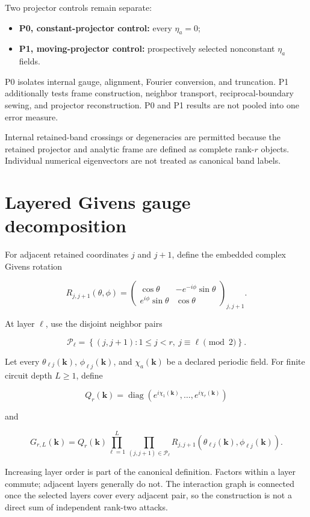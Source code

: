 \documentclass[11pt]{article}
\begin{document}
Two projector controls remain separate:

\begin{itemize}
\item \textbf{P0, constant-projector control:} every $\eta_a=0$;
\item \textbf{P1, moving-projector control:} prospectively selected nonconstant $\eta_a$ fields.
\end{itemize}

P0 isolates internal gauge, alignment, Fourier conversion, and truncation. P1 additionally
tests frame construction, neighbor transport, reciprocal-boundary sewing, and projector
reconstruction. P0 and P1 results are not pooled into one error measure.

Internal retained-band crossings or degeneracies are permitted because the retained
projector and analytic frame are defined as complete rank-$r$ objects. Individual
numerical eigenvectors are not treated as canonical band labels.

\section{Layered Givens gauge decomposition}

For adjacent retained coordinates $j$ and $j+1$, define the embedded complex Givens
rotation

\[
R_{j,j+1}(\theta,\phi)=
\begin{pmatrix}
\cos\theta&-e^{-i\phi}\sin\theta\\
e^{i\phi}\sin\theta&\cos\theta
\end{pmatrix}_{j,j+1}.
\]

At layer $\ell$, use the disjoint neighbor pairs

\[
\mathcal P_\ell=
\left\{(j,j+1):1\leq j<r,\ j\equiv\ell\pmod 2\right\}.
\]

Let every $\theta_{\ell j}(\mathbf k)$, $\phi_{\ell j}(\mathbf k)$, and
$\chi_a(\mathbf k)$ be a declared periodic field. For finite circuit depth $L\geq1$,
define

\[
Q_r(\mathbf k)=\operatorname{diag}
\left(e^{i\chi_1(\mathbf k)},\ldots,e^{i\chi_r(\mathbf k)}\right)
\]

and

\[
G_{r,L}(\mathbf k)=Q_r(\mathbf k)
\prod_{\ell=1}^{L}
\prod_{(j,j+1)\in\mathcal P_\ell}
R_{j,j+1}\!\left(
\theta_{\ell j}(\mathbf k),\phi_{\ell j}(\mathbf k)
\right).
\]

Increasing layer order is part of the canonical definition. Factors within a layer
commute; adjacent layers generally do not. The interaction graph is connected once the
selected layers cover every adjacent pair, so the construction is not a direct sum of
independent rank-two attacks.
\end{document}
